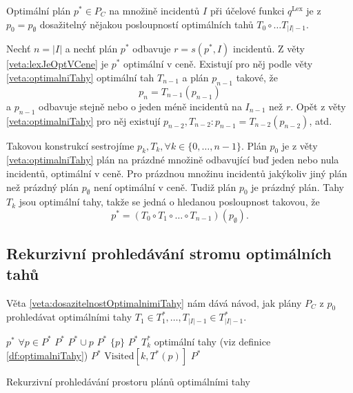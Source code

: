 \begin{veta}\label{veta:dosazitelnostOptimalnimiTahy}
  Optimální plán $p^* \in P_C$ na množině incidentů $I$ při účelové funkci $q^{\text{Lex}}$ je z $p_0 = p_{\emptyset}$
  dosažitelný nějakou posloupností optimálních tahů $T_0 \circ \dots T_{|I|-1}$.
\end{veta}
\begin{dukaz}
  Nechť $n = |I|$ a
  nechť plán $p^*$ odbavuje $r = s(p^*, I)$ incidentů.
  Z věty \ref{veta:lexJeOptVCene} je $p^*$ optimální v ceně.
  Existují pro něj podle věty \ref{veta:optimalniTahy} optimální tah $T_{n-1}$ a plán $p_{n-1}$ takové, že
  \begin{equation*}
    p_n = T_{n-1}(p_{n-1})
  \end{equation*}
  a $p_{n-1}$ odbavuje stejně nebo o jeden méně incidentů na $I_{n-1}$ než $r$.
  Opět z věty \ref{veta:optimalniTahy} pro něj existují $p_{n-2}, T_{n-2} \colon p_{n-1} = T_{n-2}(p_{n-2})$, atd.\

  Takovou konstrukcí sestrojíme $p_{k}, T_{k}, \forall k \in \{ 0, \dots, n-1 \}$. 
  Plán $p_0$ je z věty \ref{veta:optimalniTahy} plán na prázdné množině odbavující buď jeden nebo nula incidentů, optimální v ceně.
  Pro prázdnou množinu incidentů jakýkoliv jiný plán než prázdný plán $p_{\emptyset}$ není optimální v ceně.
  Tudiž plán $p_0$ je prázdný plán.
  Tahy $T_k$ jsou optimální tahy, takže se jedná o hledanou posloupnost takovou, že
  \begin{equation*}
    p^* = (T_0 \circ T_1 \circ \dots \circ T_{n-1})(p_{\emptyset}).
  \end{equation*}
\end{dukaz}

\subsection{Rekurzivní prohledávání stromu optimálních tahů}

Věta \ref{veta:dosazitelnostOptimalnimiTahy} nám dává návod, jak plány $P_C$ z $p_0$ prohledávat optimálními tahy $T_1 \in T^*_1, \dots , T_{|I| - 1} \in T^*_{|I|-1}$.

\begin{algorithm}[H]
  \begin{algorithmic}[1]
      \State $p^*$ \gets $\forall p \in P^*$
        \State $P^*$ \gets $ P^* \cup p$
        \State $P^*$ \gets $\{ p \}$
      \EndIf
      \State \Return $P^*$
    \EndIf
    \State $T^*_k$ \gets optimální tahy (viz definice \ref{df:optimalniTahy})
        \State $P^*$ \gets {}
        \State $\text{Visited}[k, T^*(p)]$ \gets {}
      \EndIf
    \EndFor
    \State \Return $P^*$
  \EndFunction
  \end{algorithmic}
  \caption{Rekurzivní prohledávání prostoru plánů optimálními tahy}
  \label{alg:rekProhPlanu}
\end{algorithm}

